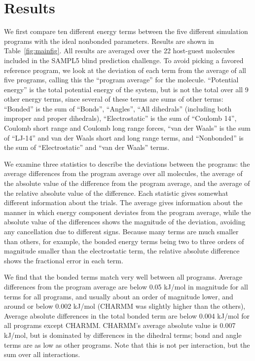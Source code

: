 \section*{Results}
We first compare ten different energy terms between the five different
simulation programs with the ideal nonbonded parameters.  Results are
shown in Table~\ref{fig:mainfig}. All results are averaged over the 22
host-guest molecules included in the SAMPL5 blind prediction
challenge. To avoid picking a favored reference program, we look at
the deviation of each term from the average of all five programs,
calling this the ``program average'' for the molecule.  ``Potential
energy'' is the total potential energy of the system, but is not the
total over all 9 other energy terms, since several of these terms are
sums of other terms: ``Bonded'' is the sum of ``Bonds'', ``Angles'',
``All dihedrals'' (including both improper and proper dihedrals),
``Electrostatic'' is the sum of ``Coulomb 14'', Coulomb short range
and Coulomb long range forces, ``van der Waals'' is the sum of
``LJ-14'' and van der Waals short and long range terms, and
``Nonbonded'' is the sum of ``Electrostatic'' and ``van der Waals''
terms.

We examine three statistics to describe the deviations between the
programs: the average differences from the program average over all
molecules, the average of the absolute value of the difference from
the program average, and the average of the relative absolute value of
the difference. Each statistic gives somewhat different information
about the trials. The average gives information about the manner in
which energy component deviates from the program average, while the
absolute value of the differences shows the magnitude of the
deviation, avoiding any cancellation due to different signs.  Because
many terms are much smaller than others, for example, the bonded
energy terms being two to three orders of magnitude smaller than the
electrostatic term, the relative absolute difference shows the
fractional error in each term.

We find that the bonded terms match very well between all
programs. Average differences from the program average are below 0.05
kJ/mol in magnitude for all terms for all programs, and usually about
an order of magnitude lower, and around or below 0.002 kJ/mol (CHARMM
was slightly higher than the others), Average absolute differences in
the total bonded term are below 0.004 kJ/mol for all programs except
CHARMM. CHARMM's average absolute value is 0.007 kJ/mol, but is
dominated by differences in the dihedral terms; bond and angle terms
are as low as other programs.  Note that this is not per interaction,
but the sum over all interactions.


